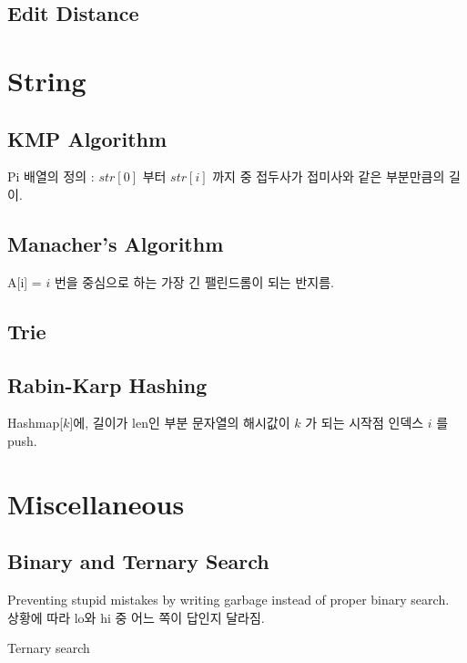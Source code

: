 \documentclass[landscape,8pt]{article}
\begin{document}
\begin{multicols}{2}
  \subsection{Edit Distance}
    

\section{String}
  \subsection{KMP Algorithm}
    Pi 배열의 정의 : $str[0]$ 부터 $str[i]$ 까지 중 접두사가 접미사와 같은 부분만큼의 길이.
    
  \subsection{Manacher's Algorithm}
    A[i] = $i$ 번을 중심으로 하는 가장 긴 팰린드롬이 되는 반지름.
    
  \subsection{Trie}
    
  \subsection{Rabin-Karp Hashing}
    Hashmap[$k$]에, 길이가 len인 부분 문자열의 해시값이 $k$ 가 되는 시작점 인덱스 $i$ 를 push.
    
\columnbreak

\section{Miscellaneous}
  \subsection{Binary and Ternary Search}
    Preventing stupid mistakes by writing garbage instead of proper binary search.\\
    상황에 따라 lo와 hi 중 어느 쪽이 답인지 달라짐.
    
    Ternary search
    

\end{multicols}
\end{document}
